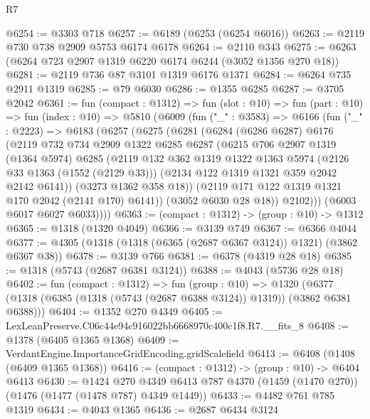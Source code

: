 \begin{lexlean}{R7}
\begin{coremodule}
@6254 := @3303 @718
@6257 := @6189 (@6253 (@6254 @6016))
@6263 := @2119 @730 @738 @2909 @5753 @6174 @6178
@6264 := @2110 @343
@6275 := @6263 (@6264 @723 @2907 @1319 @6220 @6174 @6244 (@3052 @1356 @270 @18))
@6281 := @2119 @736 @87 @3101 @1319 @6176 @1371
@6284 := @6264 @735 @2911 @1319
@6285 := @79 @6030
@6286 := @1355 @6285
@6287 := @3705 @2042
@6361 := fun (compact : @1312) =>
  fun (slot : @10) =>
  fun (part : @10) =>
  fun (index : @10) =>
  @5810
    (@6009
      (fun ("_" : @3583) =>
      @6166
        (fun ("_" : @2223) =>
        @6183
          (@6257
            (@6275
              (@6281
                (@6284
                  (@6286 @6287)
                  @6176
                  (@2119
                    @732
                    @734
                    @2909
                    @1322
                    @6285
                    @6287
                    (@6215
                      @706
                      @2907
                      @1319
                      (@1364 @5974)
                      @6285
                      (@2119
                        @132
                        @362
                        @1319
                        @1322
                        @1363
                        @5974
                        (@2126 @33 @1363 (@1552 (@2129 @33)))
                        (@2134 @122 @1319 @1321 @359 @2042 @2142 @6141))
                      (@3273 @1362 @358 @18))
                    (@2119 @171 @122 @1319 @1321 @170 @2042 (@2141 @170) @6141))
                  (@3052 @6030 @28 @18))
                @2102)))
          (@6003 @6017 @6027 @6033))))
@6363 := (compact : @1312) -> (group : @10) -> @1312
@6365 := @1318 (@1320 @4049)
@6366 := @3139 @749
@6367 := @6366 @4044
@6377 := @4305 (@1318 (@1318 (@6365 (@2687 @6367 @3124)) @1321) (@3862 @6367 @38))
@6378 := @3139 @766
@6381 := @6378 (@4319 @28 @18)
@6385 := @1318 (@5743 (@2687 @6381 @3124))
@6388 := @4043 (@5736 @28 @18)
@6402 := fun (compact : @1312) =>
  fun (group : @10) =>
  @1320 (@6377 (@1318 (@6385 (@1318 (@5743 (@2687 @6388 @3124)) @1319)) (@3862 @6381 @6388)))
@6404 := @1352 @270 @4349
@6405 := LexLeanPreserve.C06c44e94c916022bb6668970c400c1f8.R7.__fits_8
@6408 := @1378 (@6405 @1365 @1368)
@6409 := VerdantEngine.ImportanceGridEncoding.gridScalefield
@6413 := @6408 (@1408 (@6409 @1365 @1368))
@6416 := (compact : @1312) -> (group : @10) -> @6404 @6413
@6430 := @1424
    @270
    @4349
    @6413
    @787
    @4370
    (@1459 (@1470 @270))
    (@1476 (@1477 (@1478 @787) @4349 @1449))
@6433 := @4482 @761 @785 @1319
@6434 := @4043 @1365
@6436 := @2687 @6434 @3124

\end{coremodule}
\end{lexlean}

